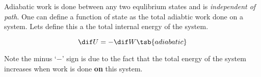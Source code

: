 \documentclass{article}
\begin{document}
Adiabatic work is done between any two equlibrium states and is \textit{independent of path}. One can define a function of state as the total adiabtic work done on a system. Lets define this a the total internal energy of the system.

\[ \dif U = - \dif W\tsb{adiabatic}\]

Note the minus `$-$' sign is due to the fact that the total energy of the system increases when work is done \textbf{on} this system.
\end{document}
